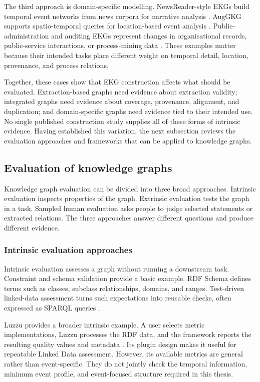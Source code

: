 The third approach is domain-specific modelling. NewsReader-style EKGs build temporal event networks from news corpora for narrative analysis \citep{newsreader2016}. AugGKG supports spatio-temporal queries for location-based event analysis \citep{auggkg2023}. Public-administration and auditing EKGs represent changes in organisational records, public-service interactions, or process-mining data \citep{paekg2024,auditingekg2024}. These examples matter because their intended tasks place different weight on temporal detail, location, provenance, and process relations.

Together, these cases show that EKG construction affects what should be evaluated. Extraction-based graphs need evidence about extraction validity; integrated graphs need evidence about coverage, provenance, alignment, and duplication; and domain-specific graphs need evidence tied to their intended use. No single published construction study supplies all of these forms of intrinsic evidence. Having established this variation, the next subsection reviews the evaluation approaches and frameworks that can be applied to knowledge graphs.

\subsection{Evaluation of knowledge graphs}

Knowledge graph evaluation can be divided into three broad approaches. Intrinsic evaluation inspects properties of the graph. Extrinsic evaluation tests the graph in a task. Sampled human evaluation asks people to judge selected statements or extracted relations. The three approaches answer different questions and produce different evidence.

\subsubsection{Intrinsic evaluation approaches}

Intrinsic evaluation assesses a graph without running a downstream task. Constraint and schema validation provide a basic example. RDF Schema defines terms such as classes, subclass relationships, domains, and ranges. Test-driven linked-data assessment turns such expectations into reusable checks, often expressed as SPARQL queries \citep{rdfs2014,testdriven2014}.

Luzzu provides a broader intrinsic example. A user selects metric implementations, Luzzu processes the RDF data, and the framework reports the resulting quality values and metadata \citep{luzzu2016}. Its plugin design makes it useful for repeatable Linked Data assessment. However, its available metrics are general rather than event-specific. They do not jointly check the temporal information, minimum event profile, and event-focused structure required in this thesis.

